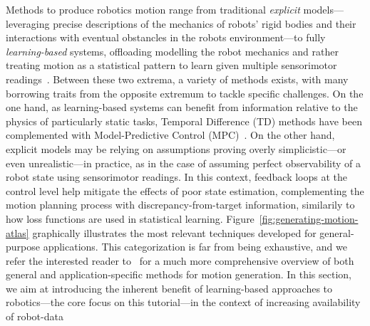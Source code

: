 Methods to produce robotics motion range from traditional \emph{explicit} models---leveraging precise descriptions of the mechanics of robots' rigid bodies and their interactions with eventual obstancles in the robots environment---to fully \emph{learning-based} systems, offloading modelling the robot mechanics and rather treating motion as a statistical pattern to learn given multiple sensorimotor readings~\citep{bekrisStateRobotMotion2024}.
Between these two extrema, a variety of methods exists, with many borrowing traits from the opposite extremum to tackle specific challenges.
On the one hand, as learning-based systems can benefit from information relative to the physics of particularly static tasks, Temporal Difference (TD) methods have been complemented with Model-Predictive Control (MPC)~\citep{hansenTemporalDifferenceLearning2022}.
On the other hand, explicit models may be relying on assumptions proving overly simplicistic---or even unrealistic---in practice, as in the case of assuming perfect observability of a robot state using sensorimotor readings. In this context, feedback loops at the control level help mitigate the effects of poor state estimation, complementing the motion planning process with discrepancy-from-target information, similarily to how loss functions are used in statistical learning.
Figure~\ref{fig:generating-motion-atlas} graphically illustrates the most relevant techniques developed for general-purpose applications. 
This categorization is far from being exhaustive, and we refer the interested reader to~\citet{bekrisStateRobotMotion2024} for a much more comprehensive overview of both general and application-specific methods for motion generation.
In this section, we aim at introducing the inherent benefit of learning-based approaches to robotics---the core focus on this tutorial---in the context of increasing availability of robot-data

